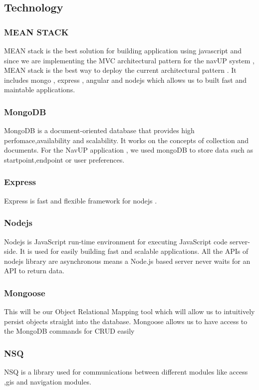 \documentclass[12pt]{article}
\begin{document}
\subsection{Technology}
\subsubsection{MEAN STACK}  
	MEAN stack is the best solution for building application using javascript and since we are implementing the MVC architectural pattern for the navUP system , MEAN stack is the best way to deploy the current architectural pattern . It includes mongo , express , angular and nodejs which allows us to built fast and maintable applications.
\subsubsection{MongoDB}	
MongoDB is a document-oriented database that provides high perfomace,availability and scalability. It works on the concepts of collection and documents. For the NavUP application , we used mongoDB to store data such as startpoint,endpoint or user preferences.
\subsubsection{Express}
Express is fast and flexible framework for nodejs . 
\subsubsection{Nodejs}	
 Nodejs is JavaScript run-time environment for executing JavaScript code server-side. It is used for easily building fast and scalable applications. All the APIs of nodejs library are asynchronous means a Node.js based server never waits for an API to return data. 
 \subsubsection{Mongoose}
 This will be our Object Relational Mapping tool which will allow us to intuitively
 persist objects straight into the database. Mongoose allows us to have access to the MongoDB commands for CRUD  easily
 \subsubsection{NSQ} 
NSQ is a library used for communications between different modules like access ,gis and navigation modules. 
\end{document}
